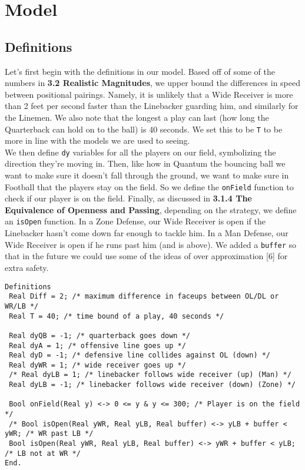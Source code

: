 \newpage 


\section{Model}

\subsection{Definitions}

\quad Let's first begin with the definitions in our model. Based off of some of the numbers in \textbf{3.2 Realistic Magnitudes}, we upper bound the differences in speed between positional pairings. Namely, it is unlikely that a Wide Receiver is more than 2 feet per second faster than the Linebacker guarding him, and similarly for the Linemen. We also note that the longest a play can last (how long the Quarterback can hold on to the ball) is 40 seconds. We set this to be \texttt{T} to be more in line with the models we are used to seeing. \\

We then define \texttt{dy} variables for all the players on our field, symbolizing the direction they're moving in. Then, like how in Quantum the bouncing ball we want to make sure it doesn't fall through the ground, we want to make sure in Football that the players stay on the field. So we define the \texttt{onField} function to check if our player is on the field. Finally, as discussed in \textbf{3.1.4 The Equivalence of Openness and Passing}, depending on the strategy, we define an \texttt{isOpen} function. In a Zone Defense, our Wide Receiver is open if the Linebacker hasn't come down far enough to tackle him. In a Man Defense, our Wide Receiver is open if he runs past him (and is above). We added a \texttt{buffer} so that in the future we could use some of the ideas of over approximation [6] for extra safety. 

\begin{lstlisting}
Definitions
 Real Diff = 2; /* maximum difference in faceups between OL/DL or WR/LB */
 Real T = 40; /* time bound of a play, 40 seconds */
 
 Real dyQB = -1; /* quarterback goes down */
 Real dyA = 1; /* offensive line goes up */
 Real dyD = -1; /* defensive line collides against OL (down) */
 Real dyWR = 1; /* wide receiver goes up */
 /* Real dyLB = 1; /* linebacker follows wide receiver (up) (Man) */
 Real dyLB = -1; /* linebacker follows wide receiver (down) (Zone) */
 
 Bool onField(Real y) <-> 0 <= y & y <= 300; /* Player is on the field */
 /* Bool isOpen(Real yWR, Real yLB, Real buffer) <-> yLB + buffer < yWR; /* WR past LB */
 Bool isOpen(Real yWR, Real yLB, Real buffer) <-> yWR + buffer < yLB; /* LB not at WR */
End.
\end{lstlisting}


